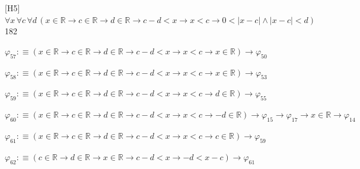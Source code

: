 \begin{fullproof}{[H5]}{$\forall x\,\forall c\,\forall d\,(x \in \mathbb{R} \to c \in \mathbb{R} \to d \in \mathbb{R} \to c - d < x \to x < c \to 0 < \lvert x - c \rvert \land \lvert x - c \rvert < d)$}{182}
\begin{abbrevlist}
\item $\varphi_{57} :\equiv (x \in \mathbb{R} \to c \in \mathbb{R} \to d \in \mathbb{R} \to c - d < x \to x < c \to x \in \mathbb{R}) \to \varphi_{50}$
\item $\varphi_{58} :\equiv (x \in \mathbb{R} \to c \in \mathbb{R} \to d \in \mathbb{R} \to c - d < x \to x < c \to x \in \mathbb{R}) \to \varphi_{53}$
\item $\varphi_{59} :\equiv (x \in \mathbb{R} \to c \in \mathbb{R} \to d \in \mathbb{R} \to c - d < x \to x < c \to d \in \mathbb{R}) \to \varphi_{55}$
\item $\varphi_{60} :\equiv (x \in \mathbb{R} \to c \in \mathbb{R} \to d \in \mathbb{R} \to c - d < x \to x < c \to -d \in \mathbb{R}) \to \varphi_{15} \to \varphi_{17} \to x \in \mathbb{R} \to \varphi_{14}$
\item $\varphi_{61} :\equiv (x \in \mathbb{R} \to c \in \mathbb{R} \to d \in \mathbb{R} \to c - d < x \to x < c \to c \in \mathbb{R}) \to \varphi_{59}$
\item $\varphi_{62} :\equiv (c \in \mathbb{R} \to d \in \mathbb{R} \to x \in \mathbb{R} \to c - d < x \to -d < x - c) \to \varphi_{61}$
\end{abbrevlist}
\end{fullproof}

